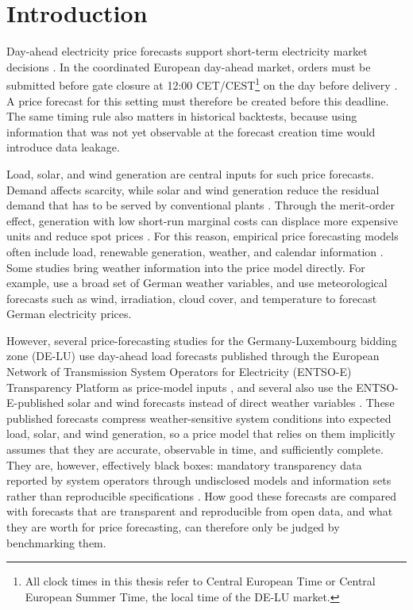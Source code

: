 \section{Introduction}
\label{sec:introduction}

Day-ahead electricity price forecasts support short-term electricity market
decisions \cite{weron2014electricity,lago2021forecasting}. In the coordinated
European day-ahead market, orders must be submitted before gate closure at
12:00 CET/CEST\footnote{All clock times in this thesis refer to Central European
Time or Central European Summer Time, the local time of the \mbox{DE-LU} market.}
on the day before delivery
\cite{epexSpotPowerMarket,epexSpotMarketCoupling}. A price forecast for this
setting must therefore be created before this deadline. The same timing rule
also matters in historical backtests, because using information that was not
yet observable at the forecast creation time would introduce data leakage.

Load, solar, and wind generation are central inputs for such price
forecasts. Demand affects scarcity, while solar and wind generation reduce the
residual demand that has to be served by conventional plants
\cite{pape2016fundamentals,do2021residualDemand}. Through the merit-order
effect, generation with low short-run marginal costs can displace more
expensive units and reduce spot prices \cite{sensfuss2008meritOrder}. For this
reason, empirical price forecasting models often include load, renewable
generation, weather, and calendar information
\cite{weron2014electricity,lago2021forecasting,maciejowska2021enhancing}.
Some studies bring weather information into the price model directly. For
example, \textcite{ludwig2015bigdata} use a broad set of German weather
variables, and \textcite{sgarlato2023weatherPredictions} use meteorological
forecasts such as wind, irradiation, cloud cover, and temperature to forecast
German electricity prices.

However, several price-forecasting studies for the Germany-Luxembourg bidding
zone (\mbox{DE-LU}) use day-ahead load forecasts published through the European Network of Transmission System Operators for
Electricity (\mbox{ENTSO-E}) Transparency Platform as price-model inputs
\cite{trebbien2023probabilistic,marcjasz2023distributional,uniejewski2025smoothing,hilger2024multivariate,eiser2026operational},
and several also use the \mbox{ENTSO-E}-published solar and wind forecasts
instead of direct weather variables
\cite{trebbien2023probabilistic,marcjasz2023distributional,hilger2024multivariate}.
These published forecasts compress weather-sensitive system conditions into
expected load, solar, and wind generation, so a price model that
relies on them implicitly assumes that they are accurate, observable in time,
and sufficiently complete. They are, however, effectively black boxes:
mandatory transparency data reported by system operators through undisclosed
models and information sets rather than reproducible specifications
\cite{euRegulation543_2013,entsoeTransparency}. How good these forecasts are compared
with forecasts that are transparent and reproducible from open data, and what
they are worth for price forecasting, can therefore only be judged by
benchmarking them.

